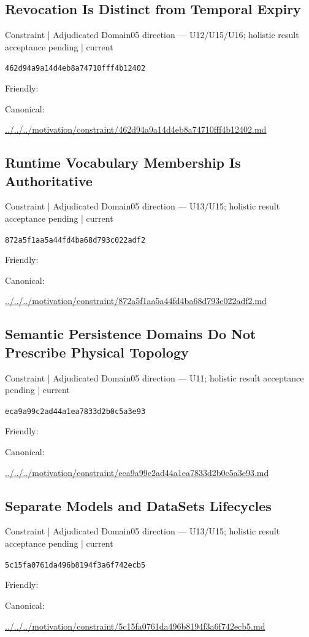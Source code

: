 \documentclass[10pt,a4paper]{article}
\begin{document}
\subsection*{Revocation Is Distinct from Temporal Expiry}
{\small Constraint | Adjudicated Domain05 direction — U12/U15/U16; holistic result acceptance pending | current}\par
\texttt{462d94a9a14d4eb8a74710fff4b12402}\par
Friendly: \par
Canonical: \par
{\footnotesize\url{../../../motivation/constraint/462d94a9a14d4eb8a74710fff4b12402.md}}\par
\subsection*{Runtime Vocabulary Membership Is Authoritative}
{\small Constraint | Adjudicated Domain05 direction — U13/U15; holistic result acceptance pending | current}\par
\texttt{872a5f1aa5a44fd4ba68d793c022adf2}\par
Friendly: \par
Canonical: \par
{\footnotesize\url{../../../motivation/constraint/872a5f1aa5a44fd4ba68d793c022adf2.md}}\par
\subsection*{Semantic Persistence Domains Do Not Prescribe Physical Topology}
{\small Constraint | Adjudicated Domain05 direction — U11; holistic result acceptance pending | current}\par
\texttt{eca9a99c2ad44a1ea7833d2b0c5a3e93}\par
Friendly: \par
Canonical: \par
{\footnotesize\url{../../../motivation/constraint/eca9a99c2ad44a1ea7833d2b0c5a3e93.md}}\par
\subsection*{Separate Models and DataSets Lifecycles}
{\small Constraint | Adjudicated Domain05 direction — U13/U15; holistic result acceptance pending | current}\par
\texttt{5c15fa0761da496b8194f3a6f742ecb5}\par
Friendly: \par
Canonical: \par
{\footnotesize\url{../../../motivation/constraint/5c15fa0761da496b8194f3a6f742ecb5.md}}\par
\end{document}

